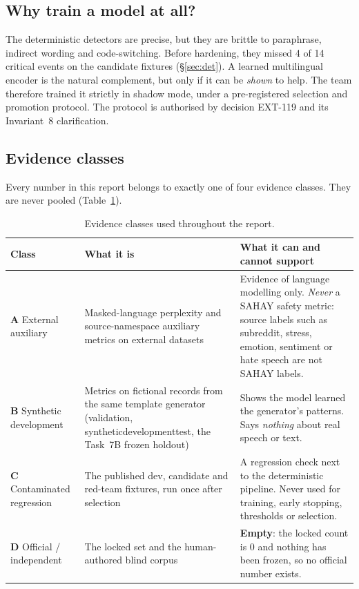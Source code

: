 \documentclass[11pt,a4paper]{article}
\newcommand{\codeus}{\textunderscore\allowbreak}
\DeclareRobustCommand{\code}[1]{{\ttfamily\let\_\codeus #1}}
\newcommand{\evA}{\textsf{\textbf{A}}}
\newcommand{\evB}{\textsf{\textbf{B}}}
\newcommand{\evC}{\textsf{\textbf{C}}}
\newcommand{\evD}{\textsf{\textbf{D}}}
\begin{document}
\subsection{Why train a model at all?}
The deterministic detectors are precise, but they are brittle to paraphrase, indirect wording and
code-switching. Before hardening, they missed 4 of 14 critical events on the candidate fixtures
(\S\ref{sec:det}). A learned multilingual encoder is the natural complement, but only if it can be
\emph{shown} to help. The team therefore trained it strictly in shadow mode, under a pre-registered
selection and promotion protocol. The protocol is authorised by decision EXT-119 and its Invariant~8
clarification.

\subsection{Evidence classes}
Every number in this report belongs to exactly one of four evidence classes. They are never pooled
(Table~\ref{tab:evidence}).

\begin{table}[!htbp]
\centering\small
\caption{Evidence classes used throughout the report.}
\label{tab:evidence}
\begin{tabularx}{\linewidth}{@{}>{\raggedright\arraybackslash}p{2.7cm}>{\raggedright\arraybackslash}p{4.3cm}X@{}}
\toprule
Class & What it is & What it can and cannot support \\
\midrule
\evA{} External auxiliary & Masked-language perplexity and source-namespace auxiliary metrics on external datasets & Evidence of language modelling only. \emph{Never} a SAHAY safety metric: source labels such as subreddit, stress, emotion, sentiment or hate speech are not SAHAY labels. \\
\evB{} Synthetic development & Metrics on fictional records from the same template generator (validation, \code{synthetic\_development\_test}, the Task~7B frozen holdout) & Shows the model learned the generator's patterns. Says \emph{nothing} about real speech or text. \\
\evC{} Contaminated regression & The published dev, candidate and red-team fixtures, run once after selection & A regression check next to the deterministic pipeline. Never used for training, early stopping, thresholds or selection. \\
\evD{} Official / independent & The locked set and the human-authored blind corpus & \textbf{Empty}: the locked count is 0 and nothing has been frozen, so no official number exists. \\
\bottomrule
\end{tabularx}
\end{table}
\end{document}
